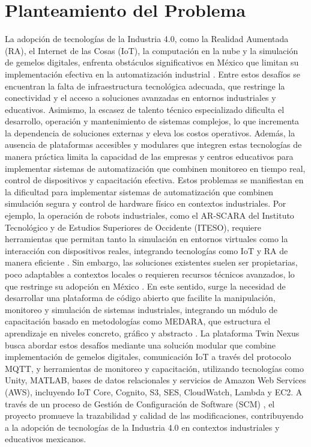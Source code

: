 \documentclass[12pt,letterpaper]{report}
\begin{document}
	\section{Planteamiento del Problema}
	La adopción de tecnologías de la Industria 4.0, como la Realidad Aumentada (RA), el Internet de las Cosas (IoT), la computación en la nube y la simulación de gemelos digitales, enfrenta obstáculos significativos en México que limitan su implementación efectiva en la automatización industrial \cite{garcia_industria_adoption_2023}. Entre estos desafíos se encuentran la falta de infraestructura tecnológica adecuada, que restringe la conectividad y el acceso a soluciones avanzadas en entornos industriales y educativos. Asimismo, la escasez de talento técnico especializado dificulta el desarrollo, operación y mantenimiento de sistemas complejos, lo que incrementa la dependencia de soluciones externas y eleva los costos operativos. Además, la ausencia de plataformas accesibles y modulares que integren estas tecnologías de manera práctica limita la capacidad de las empresas y centros educativos para implementar sistemas de automatización que combinen monitoreo en tiempo real, control de dispositivos y capacitación efectiva.
	Estos problemas se manifiestan en la dificultad para implementar sistemas de automatización que combinen simulación segura y control de hardware físico en contextos industriales. Por ejemplo, la operación de robots industriales, como el AR-SCARA del Instituto Tecnológico y de Estudios Superiores de Occidente (ITESO), requiere herramientas que permitan tanto la simulación en entornos virtuales como la interacción con dispositivos reales, integrando tecnologías como IoT y RA de manera eficiente \cite{mathworks_kinematics_scara_2023}. Sin embargo, las soluciones existentes suelen ser propietarias, poco adaptables a contextos locales o requieren recursos técnicos avanzados, lo que restringe su adopción en México \cite{martinez_industria_mexico_2023}. En este sentido, surge la necesidad de desarrollar una plataforma de código abierto que facilite la manipulación, monitoreo y simulación de sistemas industriales, integrando un módulo de capacitación basado en metodologías como MEDARA, que estructura el aprendizaje en niveles concreto, gráfico y abstracto \cite{zamora_medara_2022}.
	La plataforma Twin Nexus busca abordar estos desafíos mediante una solución modular que combine implementación de gemelos digitales, comunicación IoT a través del protocolo MQTT, y herramientas de monitoreo y capacitación, utilizando tecnologías como Unity, MATLAB, bases de datos relacionales y servicios de Amazon Web Services (AWS), incluyendo IoT Core, Cognito, S3, SES, CloudWatch, Lambda y EC2. A través de un proceso de Gestión de Configuración de Software (SCM) \cite{ieee_scm_std}, el proyecto promueve la trazabilidad y calidad de las modificaciones, contribuyendo a la adopción de tecnologías de la Industria 4.0 en contextos industriales y educativos mexicanos.
	
\end{document}

